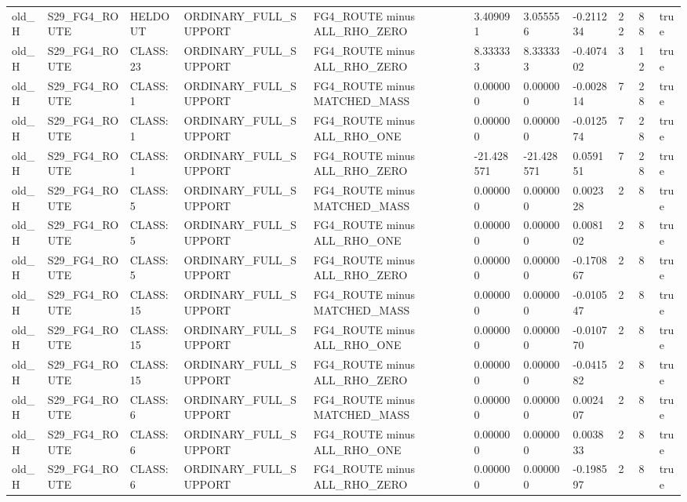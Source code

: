 \begin{tabular}{lllllllllll}
old\_H & S29\_FG4\_ROUTE & HELDOUT & ORDINARY\_FULL\_SUPPORT & FG4\_ROUTE minus ALL\_RHO\_ZERO & 3.409091 & 3.055556 & -0.211234 & 22 & 88 & true \\
old\_H & S29\_FG4\_ROUTE & CLASS:23 & ORDINARY\_FULL\_SUPPORT & FG4\_ROUTE minus ALL\_RHO\_ZERO & 8.333333 & 8.333333 & -0.407402 & 3 & 12 & true \\
old\_H & S29\_FG4\_ROUTE & CLASS:1 & ORDINARY\_FULL\_SUPPORT & FG4\_ROUTE minus MATCHED\_MASS & 0.000000 & 0.000000 & -0.002814 & 7 & 28 & true \\
old\_H & S29\_FG4\_ROUTE & CLASS:1 & ORDINARY\_FULL\_SUPPORT & FG4\_ROUTE minus ALL\_RHO\_ONE & 0.000000 & 0.000000 & -0.012574 & 7 & 28 & true \\
old\_H & S29\_FG4\_ROUTE & CLASS:1 & ORDINARY\_FULL\_SUPPORT & FG4\_ROUTE minus ALL\_RHO\_ZERO & -21.428571 & -21.428571 & 0.059151 & 7 & 28 & true \\
old\_H & S29\_FG4\_ROUTE & CLASS:5 & ORDINARY\_FULL\_SUPPORT & FG4\_ROUTE minus MATCHED\_MASS & 0.000000 & 0.000000 & 0.002328 & 2 & 8 & true \\
old\_H & S29\_FG4\_ROUTE & CLASS:5 & ORDINARY\_FULL\_SUPPORT & FG4\_ROUTE minus ALL\_RHO\_ONE & 0.000000 & 0.000000 & 0.008102 & 2 & 8 & true \\
old\_H & S29\_FG4\_ROUTE & CLASS:5 & ORDINARY\_FULL\_SUPPORT & FG4\_ROUTE minus ALL\_RHO\_ZERO & 0.000000 & 0.000000 & -0.170867 & 2 & 8 & true \\
old\_H & S29\_FG4\_ROUTE & CLASS:15 & ORDINARY\_FULL\_SUPPORT & FG4\_ROUTE minus MATCHED\_MASS & 0.000000 & 0.000000 & -0.010547 & 2 & 8 & true \\
old\_H & S29\_FG4\_ROUTE & CLASS:15 & ORDINARY\_FULL\_SUPPORT & FG4\_ROUTE minus ALL\_RHO\_ONE & 0.000000 & 0.000000 & -0.010770 & 2 & 8 & true \\
old\_H & S29\_FG4\_ROUTE & CLASS:15 & ORDINARY\_FULL\_SUPPORT & FG4\_ROUTE minus ALL\_RHO\_ZERO & 0.000000 & 0.000000 & -0.041582 & 2 & 8 & true \\
old\_H & S29\_FG4\_ROUTE & CLASS:6 & ORDINARY\_FULL\_SUPPORT & FG4\_ROUTE minus MATCHED\_MASS & 0.000000 & 0.000000 & 0.002407 & 2 & 8 & true \\
old\_H & S29\_FG4\_ROUTE & CLASS:6 & ORDINARY\_FULL\_SUPPORT & FG4\_ROUTE minus ALL\_RHO\_ONE & 0.000000 & 0.000000 & 0.003833 & 2 & 8 & true \\
old\_H & S29\_FG4\_ROUTE & CLASS:6 & ORDINARY\_FULL\_SUPPORT & FG4\_ROUTE minus ALL\_RHO\_ZERO & 0.000000 & 0.000000 & -0.198597 & 2 & 8 & true \\

\end{tabular}
